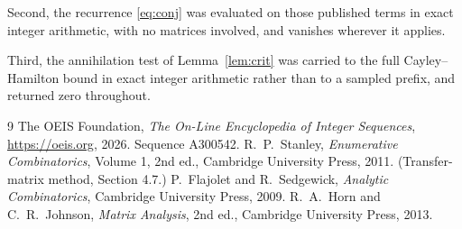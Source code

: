 \documentclass[11pt,a4paper]{article}
\theoremstyle{plain}
\theoremstyle{definition}
\begin{document}
Second, the recurrence \eqref{eq:conj} was evaluated on those published terms in exact
integer arithmetic, with no matrices involved, and vanishes wherever it applies.

Third, the annihilation test of Lemma~\ref{lem:crit} was carried to the full
Cayley--Hamilton bound in exact integer arithmetic rather than to a sampled prefix, and
returned zero throughout.

\begin{thebibliography}{9}
 The OEIS Foundation, \emph{The On-Line Encyclopedia of Integer
Sequences}, \url{https://oeis.org}, 2026. Sequence A300542.
 R.~P.~Stanley, \emph{Enumerative Combinatorics}, Volume 1, 2nd ed.,
Cambridge University Press, 2011. (Transfer-matrix method, Section 4.7.)
 P.~Flajolet and R.~Sedgewick, \emph{Analytic Combinatorics}, Cambridge
University Press, 2009.
 R.~A.~Horn and C.~R.~Johnson, \emph{Matrix Analysis}, 2nd ed., Cambridge
University Press, 2013.
\end{thebibliography}
\end{document}
